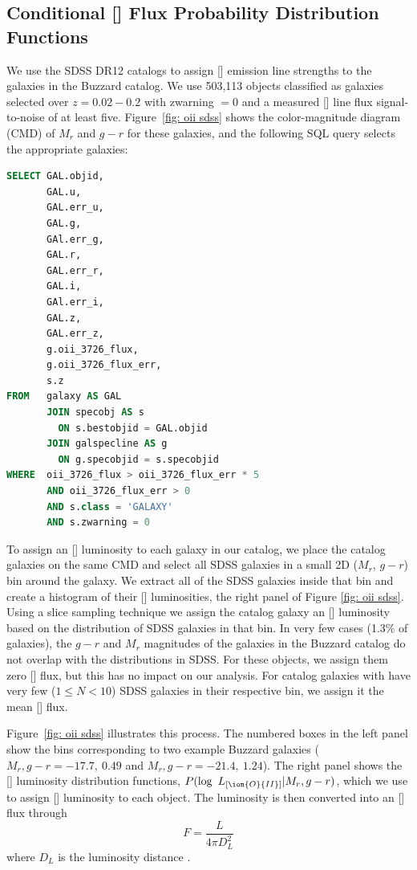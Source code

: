 \documentclass[fleqn,usenatbib]{mnras}
\begin{document}
\subsection{Conditional {\rm[]} Flux Probability Distribution Functions}\label{sec: oii luminosity}
We use the SDSS DR12 \citep{Alam2015} catalogs to assign [] emission line strengths to the galaxies in the Buzzard catalog. We use 503,113 objects classified as galaxies selected over $z = 0.02 - 0.2$ with {\sc zwarning $=0$} and a measured [] line flux signal-to-noise of at least five. Figure~\ref{fig: oii sdss} shows the color-magnitude diagram (CMD) of $M_r$ and $g-r$ for these galaxies, and the following SQL query selects the appropriate galaxies:
\begin{lstlisting}[language=SQL]
SELECT GAL.objid, 
       GAL.u, 
       GAL.err_u, 
       GAL.g, 
       GAl.err_g, 
       GAL.r, 
       GAL.err_r, 
       GAL.i, 
       GAl.err_i, 
       GAL.z, 
       GAL.err_z, 
       g.oii_3726_flux, 
       g.oii_3726_flux_err, 
       s.z 
FROM   galaxy AS GAL 
       JOIN specobj AS s 
         ON s.bestobjid = GAL.objid 
       JOIN galspecline AS g 
         ON g.specobjid = s.specobjid 
WHERE  oii_3726_flux > oii_3726_flux_err * 5 
       AND oii_3726_flux_err > 0 
       AND s.class = 'GALAXY' 
       AND s.zwarning = 0 
\end{lstlisting}

To assign an [] luminosity to each galaxy in our catalog, we place the catalog galaxies on the same CMD and select all SDSS galaxies in a small 2D ($M_r$, $g-r$) bin around the galaxy. We extract all of the SDSS galaxies inside that bin and create a histogram of their [] luminosities, the right panel of Figure \ref{fig: oii sdss}. Using a slice sampling technique \citep{Neal1997} we assign the catalog galaxy an [] luminosity based on the distribution of SDSS galaxies in that bin. In very few cases (1.3\% of galaxies), the $g-r$ and $M_r$ magnitudes of the galaxies in the Buzzard catalog do not overlap with the distributions in SDSS. For these objects, we assign them zero [] flux, but this has no impact on our analysis. For catalog galaxies with have very few ($1\leq N<10$) SDSS galaxies in their respective bin, we assign it the mean [] flux. 

Figure~\ref{fig: oii sdss} illustrates this process. The numbered boxes in the left panel show the bins corresponding to two example Buzzard galaxies ($M_r, g-r = -17.7,~0.49$ and $M_r, g-r = -21.4,~1.24$). The right panel shows the [] luminosity distribution functions, $P(\log\ L_{[\ion{O}{II}]}| M_r, g-r)$, which we use to assign [] luminosity to each object. The luminosity is then converted into an [] flux through 
\begin{equation}
	F = \frac{L}{4\pi D_L^2}
\end{equation}
where $D_L$ is the luminosity distance .
\end{document}
